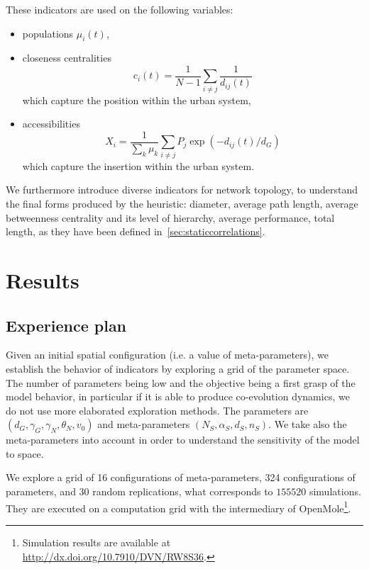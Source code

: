 These indicators are used on the following variables:
\begin{itemize}
	\item populations $\mu_i(t)$,
	\item closeness centralities
	\[c_i(t) = \frac{1}{N-1}\sum_{i\neq j} \frac{1}{d_{ij}(t)}\]
	which capture the position within the urban system,
	\item accessibilities \[X_i = \frac{1}{\sum_k \mu_k}\sum_{i\neq j} P_j \exp{\left(- d_{ij}(t)/d_G\right)}\] which capture the insertion within the urban system.
\end{itemize}



We furthermore introduce diverse indicators for network topology, to understand the final forms produced by the heuristic: diameter, average path length, average betweenness centrality and its level of hierarchy, average performance, total length, as they have been defined in~\ref{sec:staticcorrelations}.


\section{Results}


\subsection{Experience plan}

Given an initial spatial configuration (i.e. a value of meta-parameters), we establish the behavior of indicators by exploring a grid of the parameter space. The number of parameters being low and the objective being a first grasp of the model behavior, in particular if it is able to produce co-evolution dynamics, we do not use more elaborated exploration methods. The parameters are $(d_G,\gamma_G,\gamma_N,\theta_N,v_0)$ and meta-parameters $(N_S,\alpha_S,d_S,n_S)$. We take also the meta-parameters into account in order to understand the sensitivity of the model to space.


We explore a grid of 16 configurations of meta-parameters, 324 configurations of parameters, and 30 random replications, what corresponds to $155520$ simulations. They are executed on a computation grid with the intermediary of OpenMole\footnote{Simulation results are available at \url{http://dx.doi.org/10.7910/DVN/RW8S36}.}.


